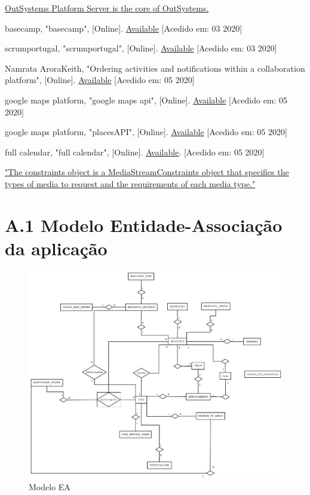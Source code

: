 \documentclass[a4paper,openright,11pt]{report}
\begin{document}
\begin{thebibliography}{9}
  \href{https://www.outsystems.com/evaluation-guide/outsystems-architecture/}{OutSystems Platform Server is the core of OutSystems.}

  basecamp, "basecamp", [Online]. \href{https://basecamp.com/}{Available} [Acedido em: 03 2020] 

  scrumportugal, "scrumportugal", [Online]. \href{http://www.scrumportugal.pt/scrum/}{Available} [Acedido em: 03 2020] 

  Namrata AroraKeith, "Ordering activities and notifications within a collaboration platform", [Online]. \href{ https://patents.google.com/patent/US9224173B2/}{Available} [Acedido em: 05 2020] 

  google maps platform, "google maps api", [Online]. \href{https://developers.google.com/maps/documentation/javascript/reference}{Available} [Acedido em: 05 2020] 
  
  google maps platform, "placesAPI", [Online]. \href{https://developers.google.com/places/web-service/intro}{Available} [Acedido em: 05 2020] 

  full calendar, "full calendar", [Online]. \href{https://fullcalendar.io/docs}{Available}. [Acedido em: 05 2020] 

  \href{https://www.digitalocean.com/community/tutorials/front-and-rear-camera-access-with-javascripts-getusermedia#step-3-—-understanding-media-constraints}{
    "The constraints object is a MediaStreamConstraints object that specifies the types of media to request and the requirements of each media type."
  }

\end{thebibliography}


\chapter*{A.1 Modelo Entidade-Associação da aplicação}
\begin{figure}[H]
  \centering 
  \includegraphics[angle=-90,origin=c, scale=0.4]{figures/ModeloEA.png}
  \caption{Modelo EA}\label{anexo:modeloEA}
\end{figure}
\end{document}
